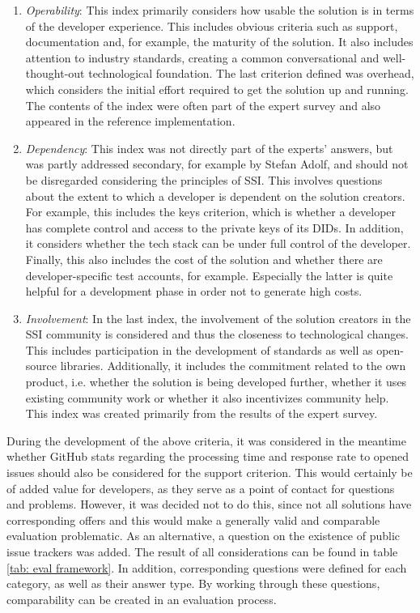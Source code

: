 \begin{enumerate}
        \item \textit{Operability}: This index primarily considers how usable the solution is in terms of the developer experience. This includes obvious criteria such as support, documentation and, for example, the maturity of the solution. It also includes attention to industry standards, creating a common conversational and well-thought-out technological foundation. The last criterion defined was overhead, which considers the initial effort required to get the solution up and running. The contents of the index were often part of the expert survey and also appeared in the reference implementation.
        \item \textit{Dependency}: This index was not directly part of the experts' answers, but was partly addressed secondary, for example by Stefan Adolf, and should not be disregarded considering the principles of \ac{SSI}. This involves questions about the extent to which a developer is dependent on the solution creators. For example, this includes the keys criterion, which is whether a developer has complete control and access to the private keys of its \acp{DID}. In addition, it considers whether the tech stack can be under full control of the developer. Finally, this also includes the cost of the solution and whether there are developer-specific test accounts, for example. Especially the latter is quite helpful for a development phase in order not to generate high costs.
        \item \textit{Involvement}: In the last index, the involvement of the solution creators in the \ac{SSI} community is considered and thus the closeness to technological changes. This includes participation in the development of standards as well as open-source libraries. Additionally, it includes the commitment related to the own product, i.e. whether the solution is being developed further, whether it uses existing community work or whether it also incentivizes community help. This index was created primarily from the results of the expert survey.
    \end{enumerate}
    
    During the development of the above criteria, it was considered in the meantime whether GitHub stats regarding the processing time and response rate to opened issues should also be considered for the support criterion. This would certainly be of added value for developers, as they serve as a point of contact for questions and problems. However, it was decided not to do this, since not all solutions have corresponding offers and this would make a generally valid and comparable evaluation problematic. As an alternative, a question on the existence of public issue trackers was added. The result of all considerations can be found in table \ref{tab: eval framework}. In addition, corresponding questions were defined for each category, as well as their answer type. By working through these questions, comparability can be created in an evaluation process.
    
